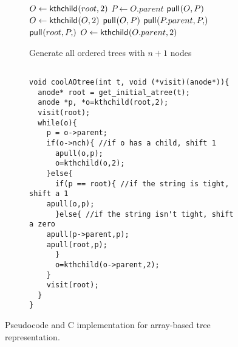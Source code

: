 \begin{figure}
    \centering
    \begin{subfigure}[t]{.49 \textwidth}
	\begin{center}
	    \begin{algorithm}[H] %
	    \begin{algorithmic}
		\State $O\gets \mathsf{kthchild}_{}(root,2)$
	\State {}
	    \State $P \gets O.parent$
		\State $\mathsf{pull}_{}(O,P)$
		\State $O \gets \mathsf{kthchild}_{}(O,2)$
	    \Else
		\State $\mathsf{pull}_{}(O,P)$
		\Else
		\State $\pull{P.parent,P}$
		\State $\pull{root,P}$
		\EndIf
		\State $O \gets \mathsf{kthchild}_{}(O.parent,2)$
	    \EndIf
	\State {}
        \EndWhile
    \EndFunction
	    \end{algorithmic}
    \caption*{Generate all ordered trees with $n+1$ nodes}
	\end{algorithm}
	\end{center}
	\label{fig:}
    \end{subfigure}
    \begin{subfigure}[t]{.5 \textwidth}
	\begin{center}
	    \vspace{.9em} %
\begin{Verbatim}[]

void coolAOtree(int t, void (*visit)(anode*)){
  anode* root = get_initial_atree(t);
  anode *p, *o=kthchild(root,2);
  visit(root);
  while(o){
    p = o->parent;
    if(o->nch){ //if o has a child, shift 1
      apull(o,p);
      o=kthchild(o,2);
    }else{
      if(p == root){ //if the string is tight, shift a 1
	apull(o,p);
      }else{ //if the string isn't tight, shift a zero
	apull(p->parent,p);
	apull(root,p);
      }
      o=kthchild(o->parent,2);
    }
    visit(root);
  }
}

\end{Verbatim}
	\end{center}
	\label{fig:}
    \end{subfigure}
    \cprotect\caption{Pseudocode and C implementation for array-based tree representation.}
    \label{fig:otreeCode}
\end{figure}
